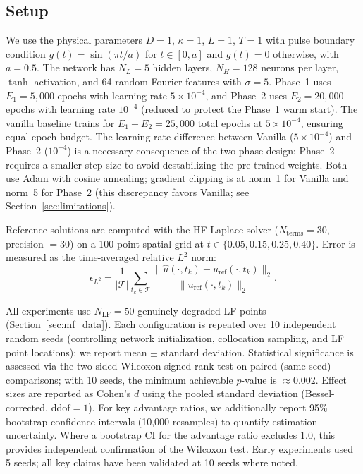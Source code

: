 \documentclass[preprint,12pt]{elsarticle}
\newcommand{\NLF}{N_{\mathrm{LF}}}
\begin{document}
\subsection{Setup}

We use the physical parameters $D = 1$, $\kappa = 1$, $L = 1$, $T = 1$ with pulse boundary condition $g(t) = \sin(\pi t / a)$ for $t \in [0, a]$ and $g(t) = 0$ otherwise, with $a = 0.5$. The network has $N_L = 5$ hidden layers, $N_H = 128$ neurons per layer, $\tanh$ activation, and 64 random Fourier features with $\sigma = 5$. Phase~1 uses $E_1 = 5{,}000$ epochs with learning rate $5 \times 10^{-4}$, and Phase~2 uses $E_2 = 20{,}000$ epochs with learning rate $10^{-4}$ (reduced to protect the Phase~1 warm start). The vanilla baseline trains for $E_1 + E_2 = 25{,}000$ total epochs at $5 \times 10^{-4}$, ensuring equal epoch budget. The learning rate difference between Vanilla ($5 \times 10^{-4}$) and Phase~2 ($10^{-4}$) is a necessary consequence of the two-phase design: Phase~2 requires a smaller step size to avoid destabilizing the pre-trained weights. Both use Adam with cosine annealing; gradient clipping is at norm~1 for Vanilla and norm~5 for Phase~2 (this discrepancy favors Vanilla; see Section~\ref{sec:limitations}).

Reference solutions are computed with the HF Laplace solver ($N_{\mathrm{terms}} = 30$, precision $= 30$) on a 100-point spatial grid at $t \in \{0.05, 0.15, 0.25, 0.40\}$. Error is measured as the time-averaged relative $L^2$ norm:
\begin{equation}
\epsilon_{L^2} = \frac{1}{|\mathcal{T}|} \sum_{t_k \in \mathcal{T}} \frac{\|\hat{u}(\cdot, t_k) - u_{\mathrm{ref}}(\cdot, t_k)\|_2}{\|u_{\mathrm{ref}}(\cdot, t_k)\|_2}.
\end{equation}

All experiments use $\NLF = 50$ genuinely degraded LF points (Section~\ref{sec:mf_data}). Each configuration is repeated over 10 independent random seeds (controlling network initialization, collocation sampling, and LF point locations); we report mean $\pm$ standard deviation. Statistical significance is assessed via the two-sided Wilcoxon signed-rank test on paired (same-seed) comparisons; with 10 seeds, the minimum achievable $p$-value is $\approx 0.002$. Effect sizes are reported as Cohen's $d$ using the pooled standard deviation (Bessel-corrected, $\mathrm{ddof} = 1$). For key advantage ratios, we additionally report 95\% bootstrap confidence intervals (10{,}000 resamples) to quantify estimation uncertainty. Where a bootstrap CI for the advantage ratio excludes 1.0, this provides independent confirmation of the Wilcoxon test. Early experiments used 5 seeds; all key claims have been validated at 10 seeds where noted.
\end{document}
